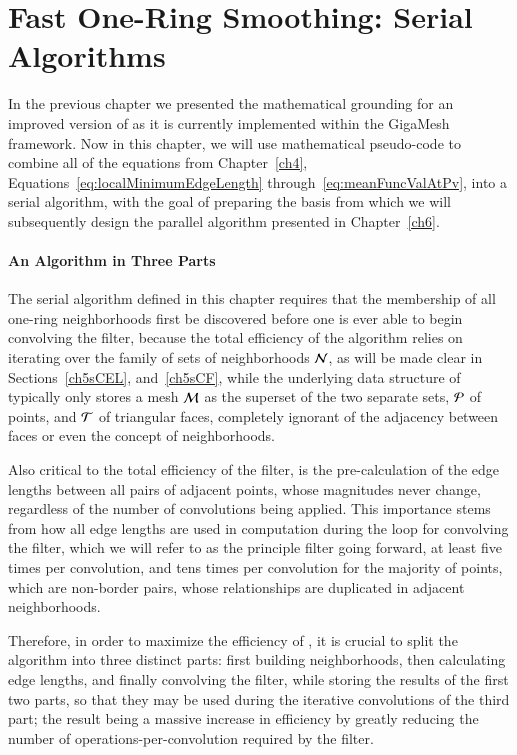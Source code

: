 \chapter{Fast One-Ring Smoothing: Serial Algorithms}
\label{ch5}
In the previous chapter we presented the mathematical grounding for an improved version of  as it is currently implemented within the GigaMesh framework. Now in this chapter, we will use mathematical pseudo-code to combine all of the equations from Chapter~\ref{ch4}, Equations~\ref{eq:localMinimumEdgeLength} through~\ref{eq:meanFuncValAtPv}, into a serial algorithm, with the goal of preparing the basis from which we will subsequently design the parallel algorithm presented in Chapter~\ref{ch6}.

%
%
\subsubsection{An Algorithm in Three Parts}
\label{ch5sssATP}
The serial algorithm defined in this chapter requires that the membership of all one-ring neighborhoods first be discovered before one is ever able to begin convolving the filter, because the total efficiency of the algorithm relies on iterating over the family of sets of neighborhoods $\mathcal{N}$, as will be made clear in Sections~\ref{ch5sCEL}, and~\ref{ch5sCF}, while the underlying data structure of \tdd{} typically only stores a mesh $\mathcal{M}$ as the superset of the two separate sets, $\mathcal{P}$ of points, and $\mathcal{T}$ of triangular faces, completely ignorant of the adjacency between faces or even the concept of neighborhoods.

Also critical to the total efficiency of the filter, is the pre-calculation of the edge lengths between all pairs of adjacent points, whose magnitudes never change, regardless of the number of convolutions being applied. This importance stems from how all edge lengths are used in computation during the loop for convolving the filter, which we will refer to as the principle filter going forward, at least five times per convolution, and tens times per convolution for the majority of points, which are non-border pairs, whose relationships are duplicated in adjacent neighborhoods.%
%

Therefore, in order to maximize the efficiency of , it is crucial to split the algorithm into three distinct parts: first building neighborhoods, then calculating edge lengths, and finally convolving the filter, while storing the results of the first two parts, so that they may be used during the iterative convolutions of the third part; the result being a massive increase in efficiency by greatly reducing the number of operations-per-convolution required by the filter.

